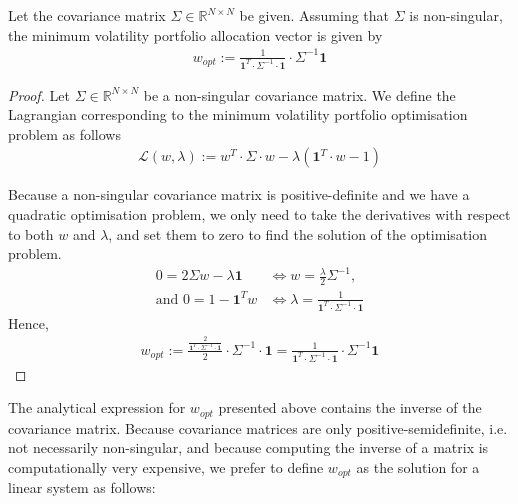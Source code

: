     \begin{theorem}
        Let the covariance matrix $\Sigma \in \mathbb{R}^{N \times N}$ be given. Assuming that $\Sigma$ is non-singular, the minimum volatility portfolio allocation vector is given by
        \begin{align*}
            w_{opt} := \frac{1}{\mathbf{1}^T \cdot \Sigma^{-1} \cdot \mathbf{1}} \cdot \Sigma^{-1} \mathbf{1}
        \end{align*}
    \end{theorem}
    
    \begin{proof}
        Let $\Sigma \in \mathbb{R}^{N \times N}$ be a non-singular covariance matrix. We define the Lagrangian corresponding to the minimum volatility portfolio optimisation problem as follows
        \begin{align*}
            \mathcal{L}(w, \lambda) := w^T \cdot \Sigma \cdot w - \lambda (\mathbf{1}^T \cdot w - 1)
        \end{align*}
        
        Because a non-singular covariance matrix is positive-definite and we have a quadratic optimisation problem, we only need to take the derivatives with respect to both $w$ and $\lambda$, and set them to zero to find the solution of the optimisation problem.
        \begin{align*}
            0 = 2 \Sigma w - \lambda \mathbf{1} &\Leftrightarrow w = \frac{\lambda}{2} \Sigma^{-1}, \\
            \text{and } 0 = 1 - \mathbf{1}^T w &\Leftrightarrow \lambda = \frac{1}{\mathbf{1}^T \cdot \Sigma^{-1} \cdot \mathbf{1}}
        \end{align*}
        Hence,
        \begin{align*}
            w_{opt} := \frac{\frac{2}{\mathbf{1}^T \cdot \Sigma^{-1} \cdot \mathbf{1}}}{2} \cdot \Sigma^{-1} \cdot \mathbf{1} = \frac{1}{\mathbf{1}^T \cdot \Sigma^{-1} \cdot \mathbf{1}} \cdot \Sigma^{-1} \mathbf{1}
        \end{align*}
    \end{proof}
    
    The analytical expression for $w_{opt}$ presented above contains the inverse of the covariance matrix. Because covariance matrices are only positive-semidefinite, i.e. not necessarily non-singular, and because computing the inverse of a matrix is computationally very expensive, we prefer to define $w_{opt}$ as the solution for a linear system as follows:
    
